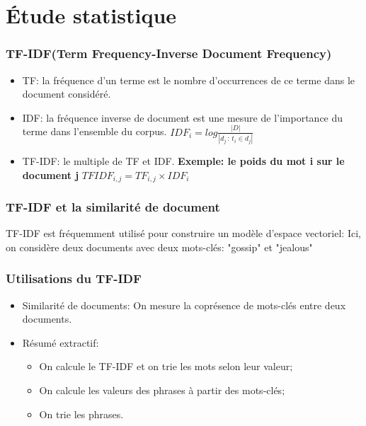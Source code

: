 \documentclass{beamer}
\begin{document}
\section{Étude statistique}
    \begin{frame}
    \frametitle{TF-IDF(Term Frequency-Inverse Document Frequency)}
    \begin{itemize}
      \item TF: la fréquence d'un terme est le nombre d'occurrences de ce terme dans le document considéré.
      \item IDF: la fréquence inverse de document est une mesure de l'importance du terme dans l'ensemble du corpus.
    $IDF_{i}=log \frac{|D|}{|d_{j}\,:\,t_{i}\in d_{j}|}$
      \item TF-IDF: le multiple de TF et IDF.\newline{}
      \textbf{Exemple: le poids du mot i sur le document j}
       $TFIDF_{i,j} = TF_{i,j} \times IDF_{i}$
    \end{itemize}
    \end{frame}

    \begin{frame}
    \frametitle{TF-IDF et la similarité de document}
    TF-IDF est fréquemment utilisé pour construire un modèle d'espace vectoriel:\newline{}
    Ici, on considère deux documents avec deux mots-clés: "gossip" et "jealous"
    \end{frame}

    \begin{frame}
    \frametitle{Utilisations du TF-IDF}
        \begin{itemize}
        \item Similarité de documents:\newline{}
        On mesure la coprésence de mots-clés entre deux documents.
        \item Résumé extractif:
            \begin{itemize}
                \item On calcule le TF-IDF et on trie les mots selon leur valeur;
                \item On calcule les valeurs des phrases à partir des mots-clés;
                \item On trie les phrases.
            \end{itemize}
        \end{itemize}
    \end{frame}
\end{document}
